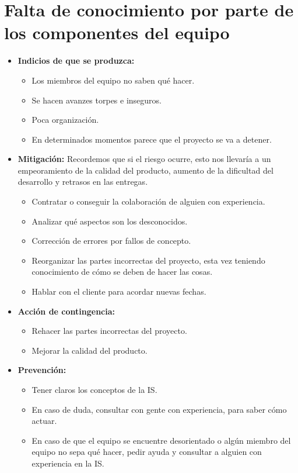 \documentclass[spanish,a4paper,11pt, twoside]{report}	%
\begin{document}
	\section{Falta de conocimiento por parte de los componentes del equipo}
		\begin{itemize}
			\item \textbf {Indicios de que se produzca: }%
				\begin{itemize}
					\item Los miembros del equipo no saben qué hacer.
					\item Se hacen avanzes torpes e inseguros.
					\item Poca organización. 
					\item En determinados momentos parece que el proyecto se va a detener.
				\end{itemize}
			\item \textbf {Mitigación: }Recordemos que si el riesgo ocurre, esto nos llevaría a un empeoramiento de la calidad
										del producto, aumento de la dificultad del desarrollo y retrasos en las entregas.
				\begin{itemize}
				  \item Contratar o conseguir la colaboración de alguien con experiencia.
				  \item Analizar qué aspectos son los desconocidos. 
				  \item Corrección de errores por fallos de concepto.
				  \item Reorganizar las partes incorrectas del proyecto, esta vez teniendo conocimiento de cómo se deben
				  		de hacer las cosas.
				  \item Hablar con el cliente para acordar nuevas fechas. 
				\end{itemize} 
			\item \textbf {Acción de contingencia: }
				\begin{itemize}
				  \item Rehacer las partes incorrectas del proyecto.
				  \item Mejorar la calidad del producto.
				\end{itemize}
			\item \textbf {Prevención: }%
				\begin{itemize}
					\item Tener claros los conceptos de la IS.
					\item En caso de duda, consultar con gente
						con experiencia, para saber cómo actuar.
					\item En caso de que el equipo se encuentre desorientado o algún miembro del equipo no sepa qué hacer,
							pedir ayuda y consultar a alguien con experiencia en la IS. 
				\end{itemize} 
			\end{itemize}
	
\end{document}
